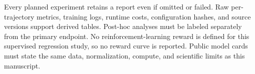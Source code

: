 Every planned experiment retains a report even if omitted or failed. Raw per-trajectory metrics, training logs, runtime costs, configuration hashes, and source versions support derived tables. Post-hoc analyses must be labeled separately from the primary endpoint. No reinforcement-learning reward is defined for this supervised regression study, so no reward curve is reported. Public model cards must state the same data, normalization, compute, and scientific limits as this manuscript.
